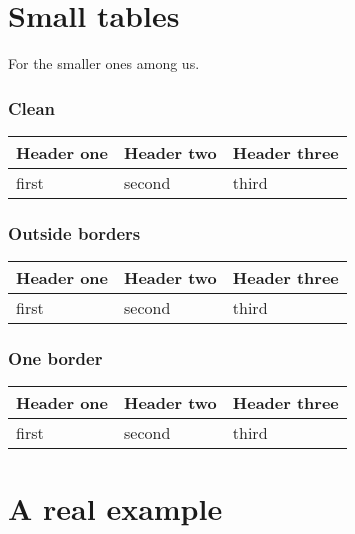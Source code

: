 \documentclass{article}
\begin{document}
\part{Small tables}

For the smaller ones among us.

\section{Clean}


\begin{tabular}{ l | l | l }
Header one  &  Header two  &  Header three
\\
\hline\hline

first  &  second  &  third
\\\hline

\end{tabular}

\section{Outside borders}


\begin{tabular}{ |l | l | l| }
 Header one  &  Header two  &  Header three \\
\hline\hline

 first  &  second  &  third \\\hline

\end{tabular}

\section{One border}


\begin{tabular}{ |l | l | l }
 Header one  &  Header two  &  Header three
\\
\hline\hline

 first  &  second  &  third
\\\hline

\end{tabular}

\part{A real example}
\end{document}
